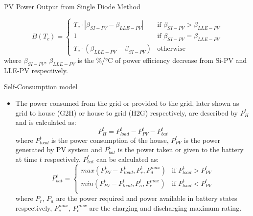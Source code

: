 \begin{frame}[c]{PV Power Output from Single Diode Method}
\begin{itemize}
            \begin{equation}
                B(T_c) =
                \begin{cases}
                T_c \cdot |\beta_{SI-PV} - \beta_{LLE-PV}| & \text{if } \beta_{SI-PV} > \beta_{LLE-PV} \\
                1 & \text{if }   \beta_{SI-PV} = \beta_{LLE-PV}\\
                T_c \cdot(\beta_{LLE-PV} - \beta_{SI-PV}) & \text{otherwise}  
                \end{cases}       
            \end{equation}
            where \(\beta_{SI-PV}\), \(\beta_{LLE-PV}\) is the \%/°C of power efficiency decrease from Si-PV and LLE-PV respectively.
    \end{itemize}
\end{frame}

\begin{frame}[c]{Self-Consumption model}

    \begin{itemize}
    
        \item The power consumed from the grid or provided to the grid, later shown as grid to house (G2H) or house to grid (H2G) respectively, are described by \(P_H^t\) 
        and is calculated as:
        \begin{equation}
            P_H^t = P_{load}^t - P_{PV}^t - P_{bat}^t
        \end{equation}
    where \(P_{load}^t\) is the power consumption of the house, \(P_{PV}^t\) is the power generated by PV system and \(P_{bat}^t\) 
    is the power taken or given to the battery at time \(t\) respectively. 
    \(P_{bat}^t\) can be calculated as:
        \begin{equation}
            P_{bat}^t =
            \begin{cases}
                max(P_{PV}^t-P_{load}^t, P_{r}^t, P_{d}^{max} ) & \text{if } P_{load}^t > P_{PV}^t \\
                min(P_{PV}^t-P_{load}^t, P_{a}^t, P_{c}^{max} ) & \text{if } P_{load}^t < P_{PV}^t \\
            \end{cases}
        \end{equation}
        where \(P_r\), \(P_a\) are the power required and power available in battery states respectively, \(P_c^{max}\), \(P_c^{max}\)
        are the charging and discharging maximum rating.
    \end{itemize}

\end{frame}


